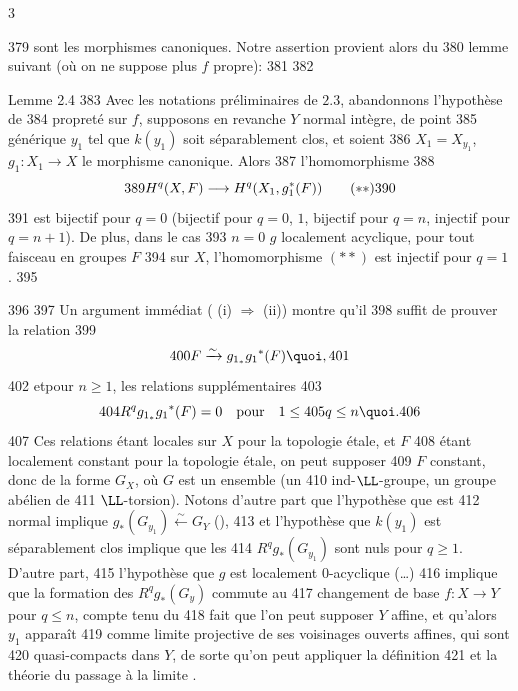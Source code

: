 3	\documentclass[10pt]{../fichiers-configuration-latex/smfart}
\begin{document}
   379	sont les morphismes canoniques. Notre assertion provient alors du
   380	lemme suivant (où on ne suppose plus $f$ propre):
   381	
   382	\begin{enonce*}{Lemme 2.4}
   383	Avec les notations préliminaires de $2.3$, abandonnons l'hypothèse de
   384	propreté sur $f$, supposons en revanche $Y$ normal intègre, de point
   385	générique $y_1$ tel que $k(y_1)$ soit séparablement clos, et soient
   386	$X_1=X_{y_1}$, $g_1:X_1\rightarrow X$ le morphisme canonique. Alors
   387	l'homomorphisme
   388	\begin{equation*}
   389	H^{q}(X,F)\longrightarrow H^{q}(X_1,g^{\ast}_1(F))\tag{${\ast}{\ast}$}
   390	\end{equation*}
   391	est bijectif pour $q=0$ (\resp bijectif pour $q=0$, $1$, 	bijectif pour $q=n$, injectif pour $q=n+1$). De plus, dans le cas
   393	$n=0$ \ie $g$ localement acyclique, pour tout faisceau en groupes $F$
   394	sur $X$, l'homomorphisme $({\ast}{\ast})$ est injectif pour $q=1$.
   395	\end{enonce*}
   396	
   397	Un argument immédiat ( (i) $\Rightarrow$ (ii)) montre qu'il
   398	suffit de prouver la relation
   399	$$
   400	F\xrightarrow{\sim} g_{1_{\ast}}g_1{}^{\ast}(F){\quoi},
   401	$$
   402	et\pageoriginale pour $n\geq 1$, les relations supplémentaires
   403	$$
   404	R^{q}g_{1_{\ast}}g_1{}^{\ast}(F)=0\quad\mbox{\rm pour}\quad 1\leq
   405	q\leq n{\quoi}.
   406	$$
   407	Ces relations étant locales sur $X$ pour la topologie étale, et $F$
   408	étant localement constant pour la topologie étale, on peut supposer
   409	$F$ constant, donc de la forme $G_X$, où $G$ est un ensemble (\resp un
   410	ind-$\LL$-groupe, \resp un groupe abélien de
   411	$\LL$-torsion). Notons d'autre part que l'hypothèse que  est
   412	normal implique $g_{\ast}(G_{y_1})\xleftarrow{\sim}G_Y$ (),
   413	et l'hypothèse que $k(y_1)$ est séparablement clos implique que les
   414	$R^{q}g_{\ast}(G_{y_1})$ sont nuls pour $q\geq 1$. D'autre part,
   415	l'hypothèse que $g$ est localement $0$-acyclique (\resp\ldots)
   416	implique que la formation des $R^{q}g_{\ast}(G_y)$ commute au
   417	changement de base $f:X\rightarrow Y$ pour $q\leq n$, compte tenu du
   418	fait que l'on peut supposer $Y$ affine, et qu'alors $y_1$ apparaît
   419	comme limite projective de ses voisinages ouverts affines, qui sont
   420	quasi-compacts dans $Y$, de sorte qu'on peut appliquer la définition
   421	 et la théorie du passage à la limite .
\end{document}
